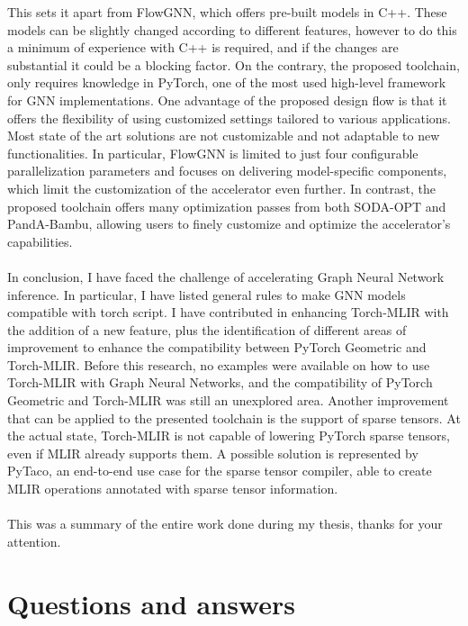 \documentclass{article}
\begin{document}
This sets it apart from FlowGNN, which offers pre-built models in C++.
These models can be slightly changed according to different features, however to do this a minimum of experience with C++ is required, and if the changes are substantial it could be a blocking factor.
On the contrary, the proposed toolchain, only requires knowledge in PyTorch, one of the most used high-level framework for GNN implementations.
One advantage of the proposed design flow is that it offers the flexibility of using customized settings tailored to various applications.
Most state of the art solutions are not customizable and not adaptable to new functionalities.
In particular, FlowGNN is limited to just four configurable parallelization parameters and focuses on delivering model-specific components, which limit the customization of the accelerator even further.
In contrast, the proposed toolchain offers many optimization passes from both SODA-OPT and PandA-Bambu, allowing users to finely customize and optimize the accelerator’s capabilities.
\\
\\
\noindent
In conclusion, I have faced the challenge of accelerating Graph Neural Network inference.
In particular, I have listed general rules to make GNN models compatible with torch script.
I have contributed in enhancing Torch-MLIR with the addition of a new feature, plus the identification of different areas of improvement to enhance the compatibility between PyTorch Geometric and Torch-MLIR.
Before this research, no examples were available on how to use Torch-MLIR with Graph Neural Networks, and the compatibility of PyTorch Geometric and Torch-MLIR was still an unexplored area.
Another improvement that can be applied to the presented toolchain is the support of sparse tensors.
At the actual state, Torch-MLIR is not capable of lowering PyTorch sparse tensors, even if MLIR already supports them. A possible solution is represented by PyTaco, an end-to-end use case for the sparse tensor compiler, able to create MLIR operations annotated with sparse tensor information.
\\
\\
\noindent
This was a summary of the entire work done during my thesis, thanks for your attention.

\section{Questions and answers}
\end{document}
